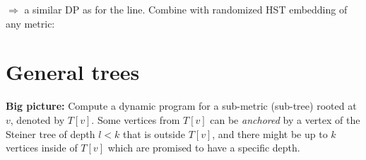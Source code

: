 \begin{multicols}{3}
$\Rightarrow$ a similar DP as for the line. Combine with randomized HST embedding of any metric:


\section{General trees}


\textbf{Big picture:} Compute a dynamic program for a sub-metric
(sub-tree) rooted at $v$, denoted by $T[v]$. Some vertices from $T[v]$
can be \textit{anchored} by a vertex of the Steiner tree of depth $l <
k$ that is outside $T[v]$, and there might be up to $k$ vertices
inside of $T[v]$ which are promised to have a specific depth.



\end{multicols}
